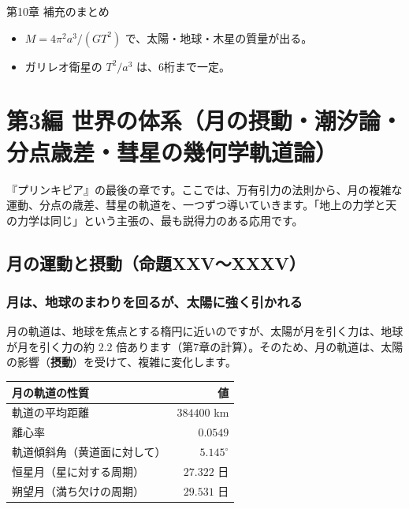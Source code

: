 \documentclass[a4paper,11pt,openany]{ltjsbook}
\begin{document}
\begin{pointbox}{第10章 補充のまとめ}
\begin{itemize}[leftmargin=*]
\item $M=4\pi^2a^3/(GT^2)$ で、太陽・地球・木星の質量が出る。
\item ガリレオ衛星の $T^2/a^3$ は、6桁まで一定。
\end{itemize}
\end{pointbox}

\chapter{第3編 世界の体系（月の摂動・潮汐論・分点歳差・彗星の幾何学軌道論）}

『プリンキピア』の最後の章です。ここでは、万有引力の法則から、月の複雑な運動、分点の歳差、彗星の軌道を、一つずつ導いていきます。「地上の力学と天の力学は同じ」という主張の、最も説得力のある応用です。

\section{月の運動と摂動（命題XXV〜XXXV）}

\subsection{月は、地球のまわりを回るが、太陽に強く引かれる}

月の軌道は、地球を焦点とする楕円に近いのですが、太陽が月を引く力は、地球が月を引く力の約 $2.2$ 倍あります（第7章の計算）。そのため、月の軌道は、太陽の影響（\textbf{摂動}）を受けて、複雑に変化します。

\begin{center}
\begin{tabular}{lr}
\toprule
月の軌道の性質 & 値\\
\midrule
軌道の平均距離 & $384400$ km\\
離心率 & $0.0549$\\
軌道傾斜角（黄道面に対して） & $5.145^\circ$\\
恒星月（星に対する周期） & $27.322$ 日\\
朔望月（満ち欠けの周期） & $29.531$ 日\\
\bottomrule
\end{tabular}
\end{center}
\end{document}
